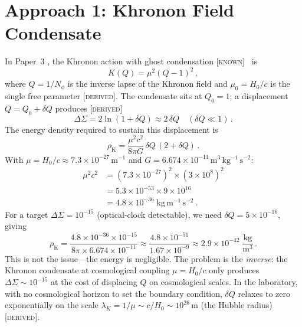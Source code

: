 \documentclass[prd,twocolumn,superscriptaddress,longbibliography,floatfix]{revtex4-2}
\newcommand{\DSigma}{\Delta\Sigma}
\newcommand{\rhoK}{\rho_{\mathrm{K}}}
\newcommand{\known}{\textsc{[known]}}
\newcommand{\derived}{\textsc{[derived]}}
\begin{document}
\section{Approach 1: Khronon Field Condensate}
\label{sec:khronon}

In Paper~3 \cite{Huang2026paper3}, the Khronon action with ghost
condensation \known~\cite{ArkaniHamed2004} is
\begin{equation}
  K(Q) = \mu^2 (Q - 1)^2\,,
  \label{eq:KQ}
\end{equation}
where $Q = 1/N_\phi$ is the inverse lapse of the Khronon field and
$\mu_0 = H_0/c$ is the single free parameter \derived.  The
condensate sits at $Q_0 = 1$; a displacement $Q = Q_0 + \delta Q$
produces \derived
\begin{equation}
  \DSigma = 2\ln(1 + \delta Q) \approx 2\,\delta Q
  \quad (\delta Q \ll 1)\,.
  \label{eq:dsigma-khronon}
\end{equation}
The energy density required to sustain this displacement is
\begin{equation}
  \rhoK = \frac{\mu^2 c^2}{8\pi G}\,\delta Q\,(2 + \delta Q)\,.
  \label{eq:rho-khronon}
\end{equation}
With $\mu = H_0/c \approx 7.3 \times 10^{-27}\,\mathrm{m}^{-1}$
and $G = 6.674 \times 10^{-11}\,\mathrm{m^3\,kg^{-1}\,s^{-2}}$:
\begin{align}
  \mu^2 c^2 &= (7.3 \times 10^{-27})^2 \times (3 \times 10^8)^2
  \nonumber \\
  &= 5.3 \times 10^{-53} \times 9 \times 10^{16}
  \nonumber \\
  &= 4.8 \times 10^{-36}\;\mathrm{kg\,m^{-1}\,s^{-2}}\,.
  \label{eq:mu2c2}
\end{align}
For a target $\DSigma = 10^{-15}$ (optical-clock detectable),
we need $\delta Q = 5 \times 10^{-16}$, giving
\begin{equation}
  \rhoK = \frac{4.8 \times 10^{-36} \times 10^{-15}}
  {8\pi \times 6.674 \times 10^{-11}}
  \approx \frac{4.8 \times 10^{-51}}{1.67 \times 10^{-9}}
  \approx 2.9 \times 10^{-42}\;\frac{\mathrm{kg}}{\mathrm{m}^3}\,.
  \label{eq:rho-khronon-num}
\end{equation}
This is not the issue---the energy is negligible.  The problem is
the \emph{inverse}: the Khronon condensate at cosmological coupling
$\mu = H_0/c$ only produces $\DSigma \sim 10^{-15}$ at the cost
of displacing $Q$ on cosmological scales.  In the laboratory,
with no cosmological horizon to set the boundary condition,
$\delta Q$ relaxes to zero exponentially on the scale
$\lambda_K = 1/\mu \sim c/H_0 \sim 10^{26}\,\mathrm{m}$ (the
Hubble radius) \derived.
\end{document}
